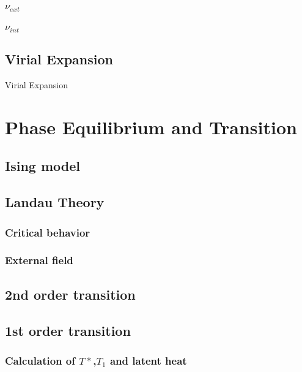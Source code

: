 \documentclass[10pt,a4paper]{article}
\begin{document}
\subsubsection{${\nu_{ext}}$}
\subsubsection{${\nu_{int}}$}
\subsection{Virial Expansion}
Virial Expansion

\section{Phase Equilibrium and Transition}
\subsection{Ising model}

\subsection{Landau Theory}
\subsubsection{Critical behavior}
\subsubsection{External field}
\subsection{2nd order transition}
\subsection{1st order transition}
\subsubsection{Calculation of $T*$,$T_1$ and latent heat}
\end{document}

